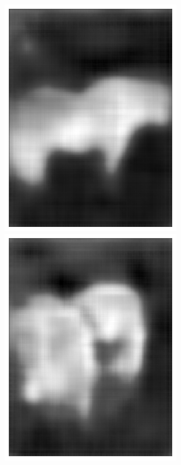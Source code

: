 \documentclass{l4proj}
\begin{document}
\begin{figure}[ht]
\begin{subfigure}[h!]{0.25\textwidth}
    \includegraphics[width=\textwidth]{images/autoencoder/pony_predicted.png}
    \includegraphics[width=\textwidth]{images/autoencoder/pony_2_predicted.png}

\end{subfigure}
\end{figure}
\end{document}
